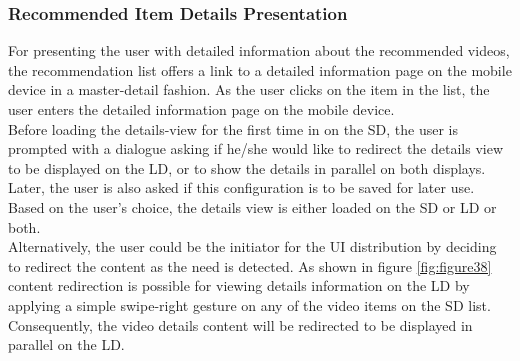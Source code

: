 \subsubsection{Recommended Item Details Presentation}
For presenting the user with detailed information about the recommended videos, the recommendation list offers a link to a detailed information page on the mobile device in a master-detail fashion. As the user clicks on the item in the list, the user enters the detailed information page on the mobile device.\\
Before loading the details-view for the first time in on the SD, the user is prompted with a dialogue asking if he/she would like to redirect the details view to be displayed on the LD, or to show the details in parallel on both displays. Later, the user is also asked if this configuration is to be saved for later use. Based on the user's choice, the details view is either loaded on the SD or LD or both.\\
Alternatively, the user could be the initiator for the UI distribution by deciding to redirect the content as the need is detected. As shown in figure \ref{fig:figure38} content redirection is possible for viewing details information on the LD by applying a simple swipe-right gesture on any of the video items on the SD list. Consequently, the video details content will be redirected to be displayed in parallel on the LD.   
    
